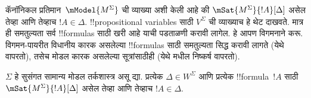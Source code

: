 \documentclass[../../../include/open-logic-section]{subfiles}
\begin{document}


कॅनॉनिकल प्रतिमान~$\mModel{M^\Sigma}$ ची व्याख्या
अशी केली आहे की $\mSat{M^\Sigma}{!A}[\Delta]$
असेल तेव्हा आणि तेव्हाच $!A \in \Delta$.
!!{propositional
variable}s साठी
$V^\Sigma$ ची व्याख्याच हे थेट दाखवते.
मात्र ही समतुल्यता सर्व !!{formula}s साठी
खरी आहे याची पडताळणी करावी लागेल.
हे आपण विगमनाने करू. विगमन-पायरीत
विधानीय कारक असलेल्या !!{formula}s साठी
समतुल्यता सिद्ध करावी लागते (येथे
 वापरतो),
तसेच मोडल कारक असलेल्या सूत्रांसाठीही
(येथे  मधील निष्कर्ष वापरतो).

\begin{prop}[सत्यता पूर्वप्रमेय]
  $\Sigma$ हे सुसंगत सामान्य मोडल तर्कशास्त्र असू द्या.
  प्रत्येक $\Delta \in W^\Sigma$ आणि प्रत्येक !!{formula}~$!A$ साठी
  $\mSat{M^\Sigma}{!A}[\Delta]$ असेल तेव्हा
  आणि तेव्हाच $!A \in \Delta$.
\end{prop}
\end{document}
